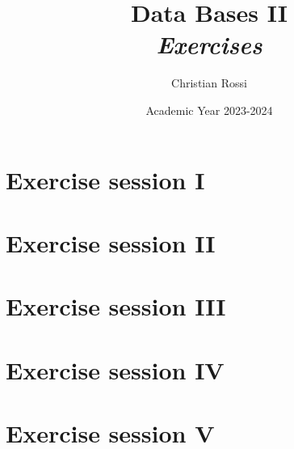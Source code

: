 \documentclass[12pt, a4paper]{report}
\title{Data Bases II \\ \textit{Exercises}}
\author{Christian Rossi}
\date{Academic Year 2023-2024}
\begin{document}
    \maketitle

    

    \cleardoublepage

    \tableofcontents

    \cleardoublepage

    \chapter{Exercise session I}
    
    
    
    
    
    

    \chapter{Exercise session II}
    
    
    
    
    
    

    \chapter{Exercise session III}
    
    
    
    
    
    
    
    
    

    \chapter{Exercise session IV}
    
    
    
    

    \chapter{Exercise session V}
    
    
        
\end{document}
